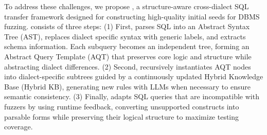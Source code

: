 \documentclass[sigconf,review,anonymous]{acmart}
\begin{document}
To address these challenges, we propose \tool{},  a structure-aware cross-dialect SQL transfer framework designed for constructing high-quality initial seeds for DBMS fuzzing. \tool{} consists of three steps:
(1) First, \tool{} parses SQL into an Abstract Syntax Tree (AST), replaces dialect specific syntax with generic labels, and extracts schema information. Each subquery becomes an independent tree, forming an Abstract Query Template (AQT) that preserves core logic and structure while abstracting dialect differences.
(2) Second, \tool{} recursively instantiates AQT nodes into dialect-specific subtrees guided by a continuously updated Hybrid Knowledge Base (Hybrid KB), generating new rules with LLMs when necessary to ensure semantic consistency. 
(3) Finally, \tool{} adapts SQL queries that are incompatible with fuzzers by using runtime feedback, converting unsupported constructs into parsable forms while preserving their logical structure to maximize testing coverage.


\end{document}
